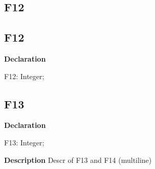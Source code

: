 \documentclass{report}
\newif\ifpdf
\begin{document}
\subsection*{\large{\textbf{F12}}\normalsize\hspace{1ex}\hrulefill}
\else
\subsection*{F12}
\fi
\label{ok_multiple_fields-F12}
\begin{list}{}{
\setlength{\itemindent}{0cm}
\setlength{\listparindent}{0cm}
\setlength{\leftmargin}{\evensidemargin}
\addtolength{\leftmargin}{\tmplength}
\settowidth{\labelsep}{X}
\addtolength{\leftmargin}{\labelsep}
\setlength{\labelwidth}{\tmplength}
}
\item[\textbf{Declaration}\hfill]
\ifpdf
\begin{flushleft}
\fi
\begin{ttfamily}
F12: Integer;\end{ttfamily}

\ifpdf
\end{flushleft}
\fi

\end{list}
\ifpdf
\subsection*{\large{\textbf{F13}}\normalsize\hspace{1ex}\hrulefill}
\else
\subsection*{F13}
\fi
\label{ok_multiple_fields-F13}
\begin{list}{}{
\setlength{\itemindent}{0cm}
\setlength{\listparindent}{0cm}
\setlength{\leftmargin}{\evensidemargin}
\addtolength{\leftmargin}{\tmplength}
\settowidth{\labelsep}{X}
\addtolength{\leftmargin}{\labelsep}
\setlength{\labelwidth}{\tmplength}
}
\item[\textbf{Declaration}\hfill]
\ifpdf
\begin{flushleft}
\fi
\begin{ttfamily}
F13: Integer;\end{ttfamily}

\ifpdf
\end{flushleft}
\fi

\par
\item[\textbf{Description}]
Descr of F13 and F14 (multiline)

\end{list}
\ifpdf
\end{document}
